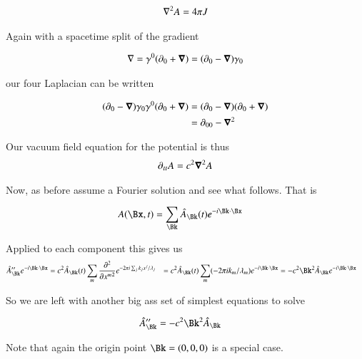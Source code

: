 \documentclass{article}
\newcommand{\PDSq}[2]{\frac{\partial^2 {#2}}{\partial {#1}^2}}
\begin{document}
\begin{align*}
\nabla^2 A = 4 \pi J
\end{align*}

Again with a spacetime split of the gradient

\begin{align*}
\nabla = \gamma^0(\partial_0 + \boldsymbol{\nabla}) = (\partial_0 - \boldsymbol{\nabla}) \gamma_0
\end{align*}

our four Laplacian can be written

\begin{align*}
(\partial_0 - \boldsymbol{\nabla}) \gamma_0 \gamma^0(\partial_0 + \boldsymbol{\nabla}) 
&= (\partial_0 - \boldsymbol{\nabla}) (\partial_0 + \boldsymbol{\nabla}) \\
&= \partial_{00} - \boldsymbol{\nabla}^2
\end{align*}

Our vacuum field equation for the potential is thus
\begin{align}
\partial_{tt} A = c^2 \boldsymbol{\nabla}^2 A
\end{align}

Now, as before assume a Fourier solution and see what follows.  That is

\begin{align*}
A(\Bx, t) &= \sum_{\Bk} \hat{A}_{\Bk}(t) e^{ -i \Bk \cdot \Bx}
\end{align*}

Applied to each component this gives us
\begin{align*}
\hat{A}_{\Bk}'' e^{ -i \Bk \cdot \Bx} 
&= c^2 \hat{A}_{\Bk}(t) \sum_m \PDSq{x^m}{} e^{ - 2 \pi i \sum_j k_j x^j /\lambda_j}
&= c^2 \hat{A}_{\Bk}(t) \sum_m (- 2 \pi i k_m/\lambda_m) e^{ - i \Bk \cdot \Bx }
&= -c^2 \Bk^2 \hat{A}_{\Bk} e^{ - i \Bk \cdot \Bx }
\end{align*}

So we are left with another big ass set of simplest equations to solve

\begin{align*}
\hat{A}_{\Bk}'' &= -c^2 \Bk^2 \hat{A}_{\Bk}
\end{align*}

Note that again the origin point $\Bk = (0,0,0)$ is a special case.




\end{document}
